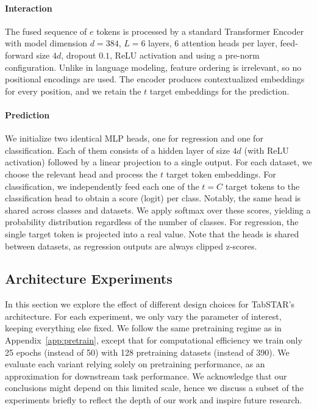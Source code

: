 \paragraph{Interaction}  
The fused sequence of $e$ tokens is processed by a standard Transformer Encoder with model dimension $d=384$, $L=6$ layers, $6$ attention heads per layer, feed‐forward size $4d$, dropout $0.1$, ReLU activation and using a pre-norm configuration. Unlike in language modeling, feature ordering is irrelevant, so no positional encodings are used. The encoder produces contextualized embeddings for every position, and we retain the $t$ target embeddings for the prediction.


\paragraph{Prediction} We initialize two identical MLP heads, one for regression and one for classification. Each of them consists of a hidden layer of size $4d$ (with ReLU activation) followed by a linear projection to a single output. For each dataset, we choose the relevant head and process the $t$ target token embeddings. For classification, we independently feed each one of the $t=C$ target tokens to the classification head to obtain a score (logit) per class. Notably, the same head is shared across classes and datasets. We apply softmax over these scores, yielding a probability distribution regardless of the number of classes. For regression, the single target token is projected into a real value. Note that the heads is shared between datasets, as regression outputs are always clipped z-scores. 

\subsection{Architecture Experiments}\label{app:arch:ablation}

In this section we explore the effect of different design choices for TabSTAR's architecture. For each experiment, we only vary the parameter of interest, keeping everything else fixed. We follow the same pretraining regime as in Appendix~\ref{app:pretrain}, except that for computational efficiency we train only 25 epochs (instead of 50) with 128 pretraining datasets (instead of 390). We evaluate each variant relying solely on pretraining performance, as an approximation for downstream task performance. We acknowledge that our conclusions might depend on this limited scale, hence we discuss a subset of the experiments briefly to reflect the depth of our work and inspire future research.

